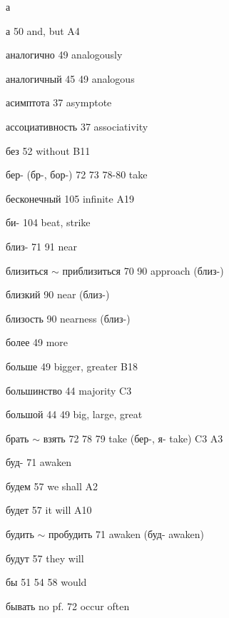 \clearpage
\thispagestyle{plain}
\begingroup
\cyrillicfont
\fontsize{7.25}{8.25}\selectfont
\setlength{\parindent}{0pt}
\setlength{\parskip}{0pt}
\setlength{\emergencystretch}{1.5em}
\noindent
\begin{minipage}[t]{0.475\textwidth}
\raggedright
\noindent а\par
\noindent а 50 and, but A4\par
\noindent аналогично 49 analogously\par
\noindent аналогичный 45 49 analogous\par
\noindent асимптота 37 asymptote\par
\noindent ассоциативность 37 associativity\par
\noindent без 52 without B11\par
\noindent бер- (бр-, бор-) 72 73 78-80 take\par
\noindent бесконечный 105 infinite A19\par
\noindent би- 104 beat, strike\par
\noindent близ- 71 91 near\par
\noindent близиться $\sim$ приблизиться 70 90 approach (близ-)\par
\noindent близкий 90 near (близ-)\par
\noindent близость 90 nearness (близ-)\par
\noindent более 49 more\par
\noindent больше 49 bigger, greater B18\par
\noindent большинство 44 majority C3\par
\noindent большой 44 49 big, large, great\par
\noindent брать $\sim$ взять 72 78 79 take (бер-, я- take) C3 A3\par
\noindent буд- 71 awaken\par
\noindent будем 57 we shall A2\par
\noindent будет 57 it will A10\par
\noindent будить $\sim$ пробудить 71 awaken (буд- awaken)\par
\noindent будут 57 they will\par
\noindent бы 51 54 58 would\par
\noindent бывать no pf. 72 occur often\par
\end{minipage}\hfill
